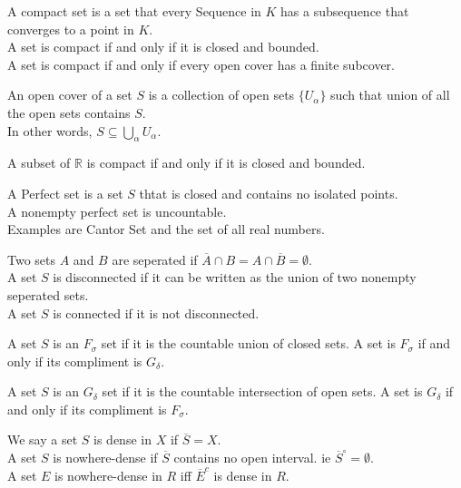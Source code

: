 \documentclass[answers,12pt,addpoints]{exam}
\begin{document}
\begin{definition}
    A compact set is a set that every Sequence in $K$ has a subsequence that converges to a point in $K$.\\
    A set is compact if and only if it is closed and bounded.\\
    A set is compact if and only if every open cover has a finite subcover.
\end{definition}
\begin{definition}
    An open cover of a set $S$ is a collection of open sets $\{U_\alpha\}$ such that union of all the open sets contains $S$.\\
    In other words, $S \subseteq \bigcup_{\alpha} U_\alpha$.
\end{definition}
\begin{theorem}
    A subset of $\mathbb{R}$ is compact if and only if it is closed and bounded.
\end{theorem}
\begin{definition}
    A Perfect set is a set $S$ thtat is closed and contains no isolated points.\\
    A nonempty perfect set is uncountable.\\
    Examples are Cantor Set and the set of all real numbers.
\end{definition}
\begin{definition}
    Two sets $A$ and $B$ are seperated if $\overline{A} \cap B = A \cap \overline{B} = \emptyset$.\\
    A set $S$ is disconnected if it can be written as the union of two nonempty seperated sets.\\
    A set $S$ is connected if it is not disconnected.
\end{definition}
\begin{definition}
    A set $S$ is an $F_\sigma$ set if it is the countable union of closed sets.
    A set is $F_\sigma$ if and only if its compliment is $G_\delta$.
\end{definition}
\begin{definition}
    A set $S$ is an $G_\delta$ set if it is the countable intersection of open sets.
    A set is $G_\delta$ if and only if its compliment is $F_\sigma$.
\end{definition}
\begin{definition}
    We say a set $S$ is dense in $X$ if $\overline{S} = X$.\\
    A set $S$ is nowhere-dense if $\overline{S}$ contains no open interval. ie $\overline{S}^\circ = \emptyset$.\\
    A set $E$ is nowhere-dense in $R$ iff $\overline{E}^c$ is dense in $R$. 
\end{definition}
\end{document}
